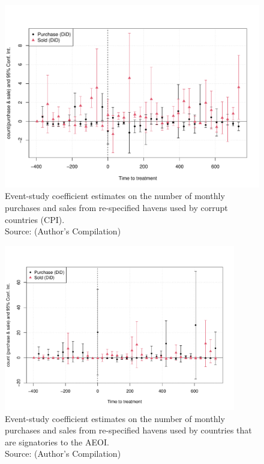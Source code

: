 \documentclass{article}
\begin{document}
\begin{figure}[H]
    \centering
    \includegraphics[width=\textwidth]{Event_study_CPI_robust.pdf}
    \caption{Event-study coefficient estimates on the number of monthly purchases and sales from re-specified havens used by corrupt countries (CPI). \\ Source: (Author's Compilation)}
    \label{fig:enter-label}
\end{figure}
\begin{figure}[H]
    \centering
    \includegraphics[width=0.9\textwidth]{Event_study_AEOI_Robust.pdf}
    \caption{Event-study coefficient estimates on the number of monthly purchases and sales from re-specified havens used by countries that are signatories to the AEOI. \\ Source: (Author's Compilation)}
    \label{fig:enter-label}
\end{figure}
\end{document}
